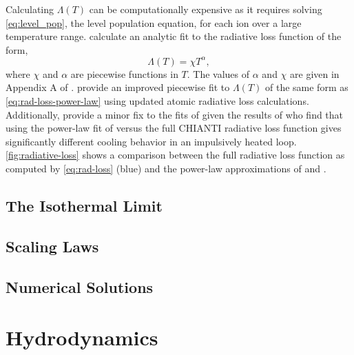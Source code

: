 Calculating $\Lambda(T)$ can be computationally expensive as it requires solving \autoref{eq:level_pop}, the level population equation, for each ion over a large temperature range. \citet{rosner_dynamics_1978} calculate an analytic fit to the radiative loss function of the form,
\begin{equation}\label{eq:rad-loss-power-law}
    \Lambda(T) = \chi T^\alpha,
\end{equation}
where $\chi$ and $\alpha$ are piecewise functions in $T$. The values of $\alpha$ and $\chi$ are given in Appendix A of \citet{rosner_dynamics_1978}. \citet{klimchuk_highly_2008} provide an improved piecewise fit to $\Lambda(T)$ of the same form as \autoref{eq:rad-loss-power-law} using updated atomic radiative loss calculations. Additionally, \citet{cargill_active_2014} provide a minor fix to the fits of \citet{klimchuk_highly_2008} given the results of \citet{reale_role_2012} who find that using the power-law fit of \citet{rosner_dynamics_1978} versus the full CHIANTI radiative loss function gives significantly different cooling behavior in an impulsively heated loop. \autoref{fig:radiative-loss} shows a comparison between the full radiative loss function as computed by \autoref{eq:rad-loss} (blue) and the power-law approximations of \citet[orange]{klimchuk_highly_2008} and \citet[green]{rosner_dynamics_1978}. 

\subsection{The Isothermal Limit}\label{sec:isothermal}

\subsection{Scaling Laws}\label{sec:scaling_laws}


\subsection{Numerical Solutions}\label{sec:hydrostatic_numerical}


\section{Hydrodynamics}\label{sec:hydrodynamics}

